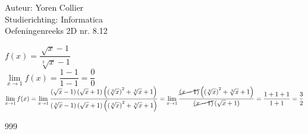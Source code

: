 \documentclass[a4paper]{article}
\newcommand{\Lh}{\left(} %
\newcommand{\Rh}{\right)}
\newcommand{\pnR}{\rightarrow} %
\newcommand{\limiet}{\lim\limits_}
\newcommand{\schrap}{\cancel}
\begin{document}
\noindent \large Auteur: Yoren Collier \\
\noindent \large Studierichting: Informatica\\
\noindent \large Oefeningenreeks 2D nr. 8.12\\

\medskip

\normalsize

$f(x) = \dfrac{\sqrt{x}-1}{\sqrt[3]{x}-1}$\\

$\limiet{x \pnR 1} f(x) = \dfrac{1-1}{1-1} = \dfrac{0}{0}$\\

$\limiet{x \pnR 1} f(x) = \limiet{x \pnR 1} 
\dfrac{\Lh \sqrt{x}-1 \Rh \Lh \sqrt{x}+1 \Rh \Lh \Lh \sqrt[3]{x} \Rh ^2 + \sqrt[3]{x} +1 \Rh} {\Lh \sqrt[3]{x}-1 \Rh \Lh \sqrt{x}+1 \Rh \Lh \Lh \sqrt[3]{x} \Rh ^2 + \sqrt[3]{x} +1 \Rh} = \limiet{x \pnR 1}
\dfrac{\schrap{\Lh x-1 \Rh} \Lh \Lh \sqrt[3]{x} \Rh ^2 + \sqrt[3]{x} +1 \Rh}{\schrap{\Lh x-1 \Rh } \Lh \sqrt{x} +1 \Rh} 
= \dfrac{1+1+1}{1+1} = \dfrac{3}{2}$\\

\begin{thebibliography}{999}
\end{thebibliography}
\end{document}
